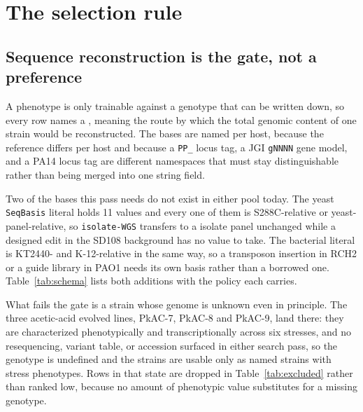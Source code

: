 
\section{The selection rule}\label{sec:rule}

\subsection{Sequence reconstruction is the gate, not a preference}\label{sec:gate}

A phenotype is only trainable against a genotype that can be written down, so every row names a
, meaning the route by which the total genomic content of one strain would
be reconstructed. The bases are named per host, because the reference differs per host and because
a \texttt{PP\_} locus tag, a JGI \texttt{gNNNN} gene model, and a PA14 locus tag are different
namespaces that must stay distinguishable rather than being merged into one string field.

Two of the bases this pass needs do not exist in either pool today. The yeast
\texttt{SeqBasis} literal holds 11 values and every one of them is S288C-relative or
yeast-panel-relative, so \texttt{isolate-WGS} transfers to a  isolate
panel unchanged while a designed edit in the SD108 background has no value to take. The
bacterial literal is KT2440- and K-12-relative in the same way, so a transposon insertion in
 RCH2 or a guide library in PAO1 needs its own basis rather than a
borrowed one. Table~\ref{tab:schema} lists both additions with the policy each carries.

What fails the gate is a strain whose genome is unknown even in principle. The three
acetic-acid evolved  lines, PkAC-7, PkAC-8 and PkAC-9, land there: they
are characterized phenotypically and transcriptionally across six stresses, and no
resequencing, variant table, or accession surfaced in either search pass, so the genotype is
undefined and the strains are usable only as named strains with stress phenotypes. Rows in
that state are dropped in Table~\ref{tab:excluded} rather than ranked low, because no amount
of phenotypic value substitutes for a missing genotype.

